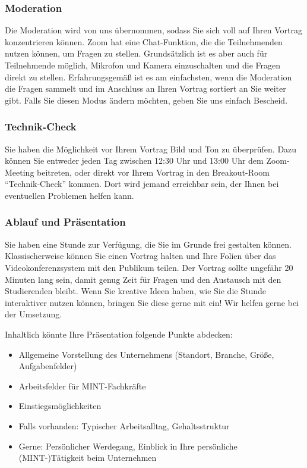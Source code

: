 \documentclass[
  paper=a4,
  fontsize=12pt,
  DIV=16,
  headheight=30pt,
  footheight=45pt,
  headinclude,
  parskip=half,
]{scrartcl}
\begin{document}
\subsubsection*{Moderation}
Die Moderation wird von uns übernommen, sodass Sie sich voll auf Ihren Vortrag konzentrieren können.
Zoom hat eine Chat-Funktion, die die Teilnehmenden nutzen können, um Fragen zu stellen.
Grundsätzlich ist es aber auch für Teilnehmende möglich, Mikrofon und Kamera einzuschalten und die Fragen direkt zu stellen.
Erfahrungsgemäß ist es am einfachsten, wenn die Moderation die Fragen sammelt und im Anschluss an Ihren Vortrag sortiert an Sie weiter gibt.
Falls Sie diesen Modus ändern möchten, geben Sie uns einfach Bescheid.


\subsubsection*{Technik-Check}
Sie haben die Möglichkeit vor Ihrem Vortrag Bild und Ton zu überprüfen.
Dazu können Sie entweder jeden Tag zwischen 12:30 Uhr und 13:00 Uhr dem Zoom-Meeting beitreten, oder direkt vor Ihrem Vortrag in den Breakout-Room \enquote{Technik-Check} kommen.
Dort wird jemand erreichbar sein, der Ihnen bei eventuellen Problemen helfen kann.


\subsubsection*{Ablauf und Präsentation}
Sie haben eine Stunde zur Verfügung, die Sie im Grunde frei gestalten können.
Klassischerweise können Sie einen Vortrag halten und Ihre Folien über das Videokonferenzsystem mit den Publikum teilen.
Der Vortrag sollte ungefähr 20 Minuten lang sein, damit genug Zeit für Fragen und den Austausch mit den Studierenden bleibt.
Wenn Sie kreative Ideen haben, wie Sie die Stunde interaktiver nutzen können, bringen Sie diese gerne mit ein!
Wir helfen gerne bei der Umsetzung.

Inhaltlich könnte Ihre Präsentation folgende Punkte abdecken:
\begin{itemize}
    \item Allgemeine Vorstellung des Unternehmens (Standort, Branche, Größe, Aufgabenfelder)
    \item Arbeitsfelder für MINT-Fachkräfte
    \item Einstiegsmöglichkeiten
    \item Falls vorhanden: Typischer Arbeitsalltag, Gehaltsstruktur
    \item Gerne: Persönlicher Werdegang, Einblick in Ihre persönliche (MINT-)Tätigkeit beim Unternehmen
\end{itemize} 
\end{document}
